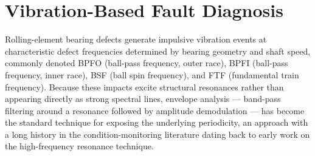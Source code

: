 \section{Vibration-Based Fault Diagnosis}
Rolling-element bearing defects generate impulsive vibration events at characteristic defect
frequencies determined by bearing geometry and shaft speed, commonly denoted BPFO (ball-pass
frequency, outer race), BPFI (ball-pass frequency, inner race), BSF (ball spin frequency), and
FTF (fundamental train frequency). Because these impacts excite structural resonances rather than
appearing directly as strong spectral lines, envelope analysis --- band-pass filtering around a
resonance followed by amplitude demodulation --- has become the standard technique for exposing
the underlying periodicity, an approach with a long history in the condition-monitoring
literature dating back to early work on the high-frequency resonance technique.
